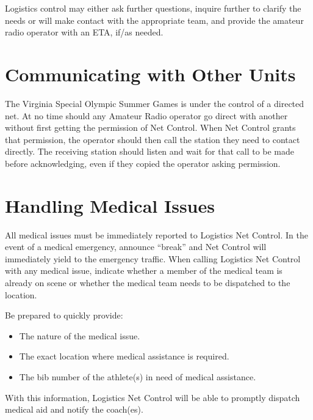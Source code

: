 \documentclass[pdflatex,letterpaper,twoside,12pt]{book}
\begin{document}
Logistics control may either ask further questions, inquire further to clarify the needs or will make contact with the appropriate team, and provide the amateur radio operator with an ETA, if/{}as needed.


\section{Communicating with Other Units}

The Virginia Special Olympic Summer Games is under the control of a directed net. At no time should any Amateur Radio operator go direct with another without first getting the permission of Net Control. When Net Control grants that permission, the operator should then call the station they need to contact directly. The receiving station should listen and wait for that call to be made before acknowledging, even if they copied the operator asking permission.


\section{Handling Medical Issues}

All medical issues must be immediately reported to Logistics Net Control.  In the event of a medical emergency, announce ``break'' and Net Control will immediately yield to the emergency traffic.  When calling Logistics Net Control with any medical issue, indicate whether a member of the medical team is already on scene or whether the medical team needs to be dispatched to the location.

Be prepared to quickly provide:

\begin{itemize}
	\item The nature of the medical issue.
	\item The exact location where medical assistance is required.
	\item The bib number of the athlete(s) in need of medical assistance.
\end{itemize}

With this information, Logistics Net Control will be able to promptly dispatch medical aid and notify the coach(es).
\end{document}
